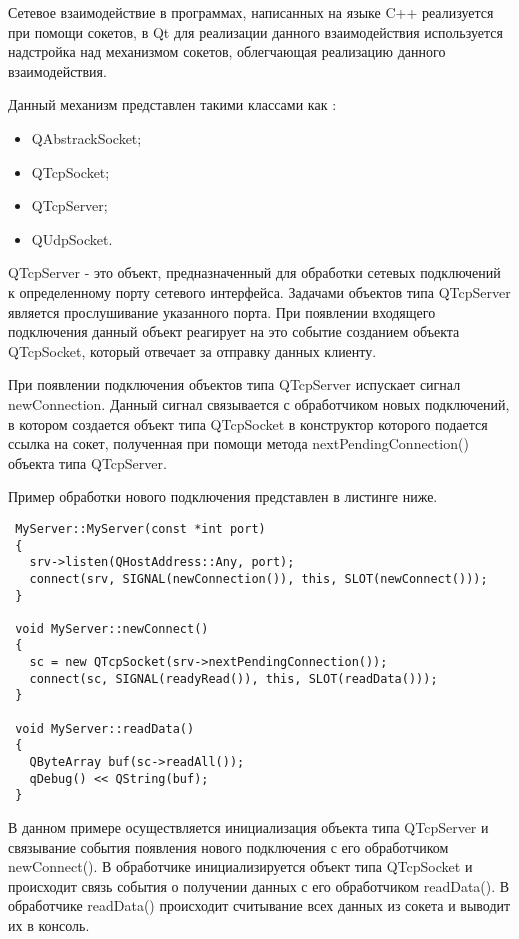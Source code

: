 Сетевое взаимодействие в программах, написанных на языке C++ реализуется при помощи сокетов\cite{cpp}, в Qt для реализации данного взаимодействия используется надстройка над механизмом сокетов, облегчающая реализацию данного взаимодействия.

Данный механизм представлен такими классами как \cite{qt}:
\begin{itemize}
 \item QAbstrackSocket;
 \item QTcpSocket;
 \item QTcpServer;
 \item QUdpSocket.
\end{itemize}

QTcpServer - это объект, предназначенный для обработки сетевых подключений к определенному порту сетевого интерфейса. Задачами объектов типа QTcpServer является прослушивание указанного порта. При появлении входящего подключения данный объект реагирует на это событие созданием объекта QTcpSocket, который отвечает за отправку данных клиенту. 

При появлении подключения объектов типа QTcpServer испускает сигнал newConnection. Данный сигнал связывается с обработчиком новых подключений, в котором создается объект типа QTcpSocket в конструктор которого подается ссылка на сокет, полученная при помощи метода nextPendingConnection() объекта типа QTcpServer. 

Пример обработки нового подключения представлен в листинге ниже.

\begin{lstlisting}
 MyServer::MyServer(const *int port)
 {
   srv->listen(QHostAddress::Any, port);
   connect(srv, SIGNAL(newConnection()), this, SLOT(newConnect()));
 }
 
 void MyServer::newConnect()
 {
   sc = new QTcpSocket(srv->nextPendingConnection());
   connect(sc, SIGNAL(readyRead()), this, SLOT(readData()));
 }
 
 void MyServer::readData()
 {
   QByteArray buf(sc->readAll());
   qDebug() << QString(buf);
 }
\end{lstlisting}

В данном примере осуществляется инициализация объекта типа QTcpServer и связывание события появления нового подключения с его обработчиком newConnect(). В обработчике инициализируется объект типа QTcpSocket и происходит связь события о получении данных с его обработчиком readData(). В обработчике readData() происходит считывание всех данных из сокета и выводит их в консоль.

